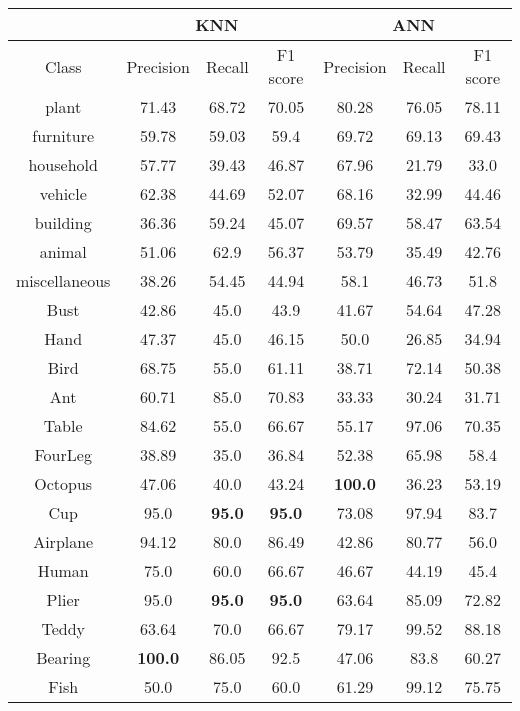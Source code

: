 \begin{table}[H]
    \centering
    \begin{tabular}{c|c|c|c|c|c|c}
         & \multicolumn{3}{c|}{KNN} & \multicolumn{3}{c}{ANN} \\
        \hline
        Class & Precision & Recall & F1 score & Precision & Recall & F1 score \\
        \hline
        plant & 71.43 & 68.72 & 70.05 & 80.28 & 76.05 & 78.11 \\ 
        furniture & 59.78 & 59.03 & 59.4 & 69.72 & 69.13 & 69.43 \\ 
        household & 57.77 & 39.43 & 46.87 & 67.96 & 21.79 & 33.0 \\ 
        vehicle & 62.38 & 44.69 & 52.07 & 68.16 & 32.99 & 44.46 \\ 
        building & 36.36 & 59.24 & 45.07 & 69.57 & 58.47 & 63.54 \\ 
        animal & 51.06 & 62.9 & 56.37 & 53.79 & 35.49 & 42.76 \\ 
        miscellaneous & 38.26 & 54.45 & 44.94 & 58.1 & 46.73 & 51.8 \\ 
        Bust & 42.86 & 45.0 & 43.9 & 41.67 & 54.64 & 47.28 \\ 
        Hand & 47.37 & 45.0 & 46.15 & 50.0 & 26.85 & 34.94 \\ 
        Bird & 68.75 & 55.0 & 61.11 & 38.71 & 72.14 & 50.38 \\ 
        Ant & 60.71 & 85.0 & 70.83 & 33.33 & 30.24 & 31.71 \\ 
        Table & 84.62 & 55.0 & 66.67 & 55.17 & 97.06 & 70.35 \\ 
        FourLeg & 38.89 & 35.0 & 36.84 & 52.38 & 65.98 & 58.4 \\ 
        Octopus & 47.06 & 40.0 & 43.24 & \textbf{100.0} & 36.23 & 53.19 \\ 
        Cup & 95.0 & \textbf{95.0} & \textbf{95.0} & 73.08 & 97.94 & 83.7 \\ 
        Airplane & 94.12 & 80.0 & 86.49 & 42.86 & 80.77 & 56.0 \\ 
        Human & 75.0 & 60.0 & 66.67 & 46.67 & 44.19 & 45.4 \\ 
        Plier & 95.0 & \textbf{95.0} & \textbf{95.0} & 63.64 & 85.09 & 72.82 \\ 
        Teddy & 63.64 & 70.0 & 66.67 & 79.17 & 99.52 & 88.18 \\ 
        Bearing & \textbf{100.0} & 86.05 & 92.5 & 47.06 & 83.8 & 60.27 \\ 
        Fish & 50.0 & 75.0 & 60.0 & 61.29 & 99.12 & 75.75 \\ 

\end{tabular}
\end{table}
